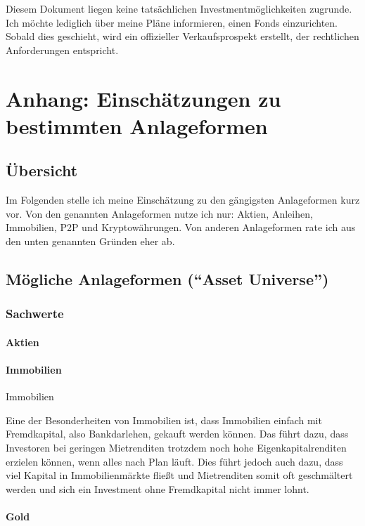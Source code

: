 \documentclass{article}
\begin{document}
Diesem Dokument liegen keine tatsächlichen Investmentmöglichkeiten zugrunde. Ich möchte lediglich über meine Pläne informieren, einen Fonds einzurichten. Sobald dies geschieht, wird ein offizieller Verkaufsprospekt erstellt, der rechtlichen Anforderungen entspricht.

\section{Anhang: Einschätzungen zu bestimmten Anlageformen}

\subsection{Übersicht}

Im Folgenden stelle ich meine Einschätzung zu den gängigsten Anlageformen kurz vor. Von den genannten Anlageformen nutze ich nur: Aktien, Anleihen, Immobilien, P2P und Kryptowährungen. Von anderen Anlageformen rate ich aus den unten genannten Gründen eher ab.

\subsection{Mögliche Anlageformen (``Asset Universe'')}

\subsubsection{Sachwerte}

\paragraph{Aktien}

\paragraph{Immobilien}

Immobilien 

Eine der Besonderheiten von Immobilien ist, dass Immobilien einfach mit Fremdkapital, also Bankdarlehen, gekauft werden können. Das führt dazu, dass Investoren bei geringen Mietrenditen trotzdem noch hohe Eigenkapitalrenditen erzielen können, wenn alles nach Plan läuft. Dies führt jedoch auch dazu, dass viel Kapital in Immobilienmärkte fließt und Mietrenditen somit oft geschmältert werden und sich ein Investment ohne Fremdkapital nicht immer lohnt. 

\paragraph{Gold}
\end{document}
